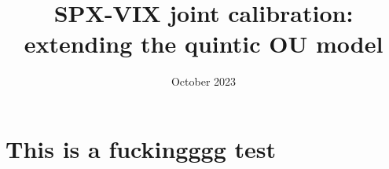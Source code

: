 \documentclass[a4paper, 12pt]{article}
\title{SPX-VIX joint calibration: extending the quintic OU model}
\author{}
\date{October 2023}
\begin{document}
\maketitle

\section{This is a fuckingggg test}
\end{document}
